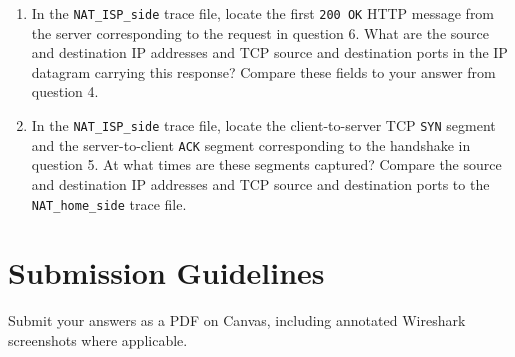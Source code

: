 \documentclass[12pt]{article}
\begin{document}
\begin{enumerate}[label=Q\arabic*:]
    \item In the \texttt{NAT\_ISP\_side} trace file, locate the first \texttt{200 OK} HTTP message from the server corresponding to the request in question 6. What are the source and destination IP addresses and TCP source and destination ports in the IP datagram carrying this response? Compare these fields to your answer from question 4.

    \item In the \texttt{NAT\_ISP\_side} trace file, locate the client-to-server TCP \texttt{SYN} segment and the server-to-client \texttt{ACK} segment corresponding to the handshake in question 5. At what times are these segments captured? Compare the source and destination IP addresses and TCP source and destination ports to the \texttt{NAT\_home\_side} trace file.
\end{enumerate}


\section*{Submission Guidelines}

Submit your answers as a PDF on Canvas, including annotated Wireshark screenshots where applicable. 
\end{document}
